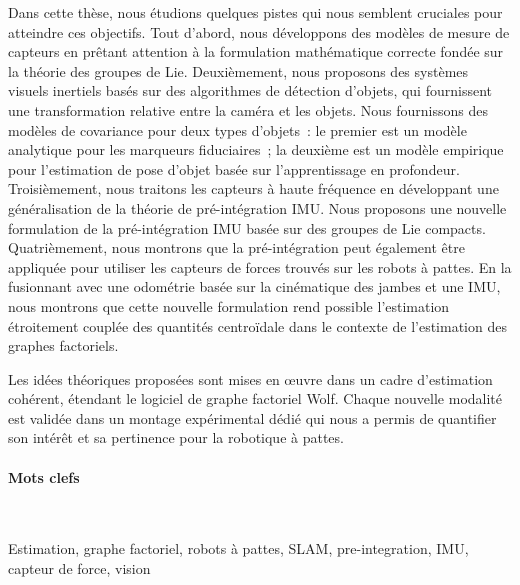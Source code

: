 Dans cette thèse, nous étudions quelques pistes qui nous semblent cruciales pour atteindre ces objectifs. Tout d'abord, nous développons des modèles de mesure de 
capteurs en prêtant attention à la formulation mathématique correcte fondée sur la théorie des groupes de Lie.
Deuxièmement, nous proposons des systèmes visuels inertiels basés sur des algorithmes de détection d'objets, qui fournissent une transformation relative entre la caméra 
et les objets.
Nous fournissons des modèles de covariance pour deux types d'objets : le premier est un modèle analytique pour les marqueurs fiduciaires ; la deuxième
est un modèle empirique pour l'estimation de pose d'objet basée sur l'apprentissage en profondeur.
Troisièmement, nous traitons les capteurs à haute fréquence en développant une généralisation de la théorie de pré-intégration IMU. Nous proposons une nouvelle 
formulation de la pré-intégration IMU basée sur des groupes de Lie compacts.
Quatrièmement, nous montrons que la pré-intégration peut également être appliquée pour utiliser les capteurs de forces trouvés sur les robots à pattes.
En la fusionnant avec une odométrie basée sur la cinématique des jambes et une IMU, nous montrons que cette nouvelle formulation rend possible l'estimation 
étroitement couplée des quantités centroïdale dans le contexte de l'estimation des graphes factoriels.

Les idées théoriques proposées sont mises en œuvre dans un cadre d'estimation cohérent, étendant le logiciel de graphe factoriel Wolf. 
Chaque nouvelle modalité est validée dans un montage expérimental dédié qui nous a permis de quantifier son intérêt et sa pertinence pour la robotique à pattes.


\paragraph{Mots clefs} ~

Estimation, graphe factoriel, robots à pattes, SLAM, pre-integration, IMU, capteur de force, vision 


\noindent\makebox[\linewidth]{\rule{0.6\textwidth}{2pt}}

\normalsize